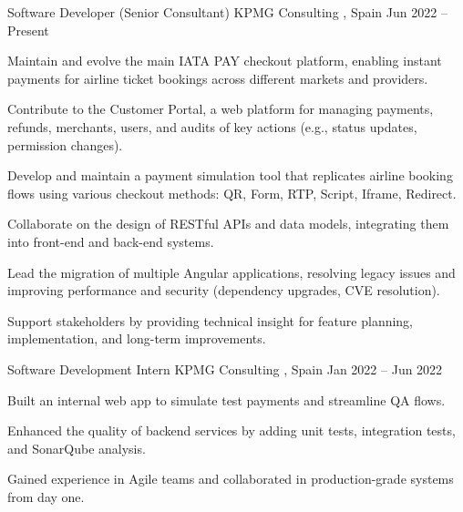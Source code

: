 

\begin{cventries}

  \cventry
    {Software Developer (Senior Consultant)} %
    {KPMG Consulting} %
    {\comMadrid, Spain} %
    {Jun 2022 – Present} %
    {
      \begin{cvitems} %
        \item {Maintain and evolve the main IATA PAY checkout platform, enabling instant payments for airline ticket bookings across different markets and providers.}
        \item {Contribute to the Customer Portal, a web platform for managing payments, refunds, merchants, users, and audits of key actions (e.g., status updates, permission changes).}
        \item {Develop and maintain a payment simulation tool that replicates airline booking flows using various checkout methods: QR, Form, RTP, Script, Iframe, Redirect.}
        \item {Collaborate on the design of RESTful APIs and data models, integrating them into front-end and back-end systems.}
        \item {Lead the migration of multiple Angular applications, resolving legacy issues and improving performance and security (dependency upgrades, CVE resolution).}
        \item {Support stakeholders by providing technical insight for feature planning, implementation, and long-term improvements.}
      \end{cvitems}
    }

  \cventry
    {Software Development Intern} %
    {KPMG Consulting} %
    {\comMadrid, Spain} %
    {Jan 2022 – Jun 2022} %
    {
      \begin{cvitems} %
        \item {Built an internal web app to simulate test payments and streamline QA flows.}
        \item {Enhanced the quality of backend services by adding unit tests, integration tests, and SonarQube analysis.}
        \item {Gained experience in Agile teams and collaborated in production-grade systems from day one.}
      \end{cvitems}
    }

\end{cventries}
